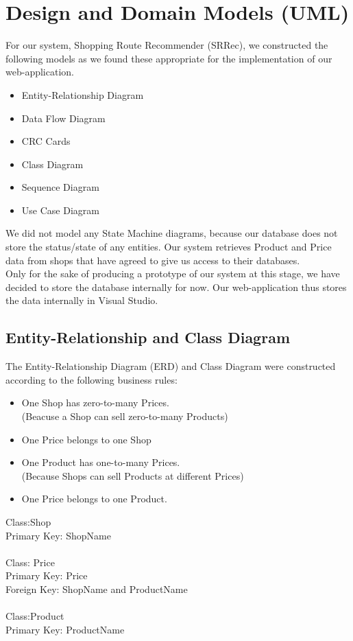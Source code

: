 \documentclass[12pt]{article}
\begin{document}
\section{Design and Domain Models (UML)}
For our system, Shopping Route Recommender (SRRec), we constructed the following models as we found these appropriate for the implementation of our web-application.
\begin{itemize}
\item Entity-Relationship Diagram
\item Data Flow Diagram
\item CRC Cards
\item Class Diagram
\item Sequence Diagram
\item Use Case Diagram
\end{itemize}
We did not model any State Machine diagrams, because our database does not store the status/state of any entities. Our system retrieves Product and Price data from shops that have agreed to give us access to their databases.\\
Only for the sake of producing a prototype of our system at this stage, we have decided to store the database internally for now. Our web-application thus stores the data internally in Visual Studio.
\subsection{Entity-Relationship and Class Diagram}
The Entity-Relationship Diagram (ERD) and Class Diagram were constructed according to the following business rules:
\begin{itemize}
\item One Shop has zero-to-many Prices. \\(Beacuse a Shop can sell zero-to-many Products)
\item One Price belongs to one Shop
\item One Product has one-to-many Prices. \\(Because Shops can sell Products at different Prices)
\item One Price belongs to one Product.
\end{itemize}
Class:Shop\\
Primary Key: Shop\textunderscore Name \\ \\
Class: Price\\
Primary Key: Price\\
Foreign Key: Shop\textunderscore Name and Product\textunderscore Name\\ \\
Class:Product\\
Primary Key: Product\textunderscore Name\\\\
\end{document}
